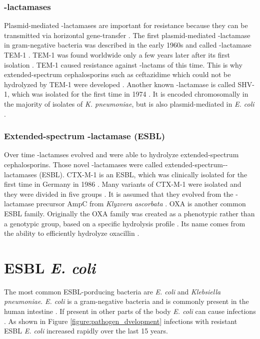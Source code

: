 \subsubsection{\textbeta-lactamases}
\label{section:resistance_mechanisms}
Plasmid-mediated \textbeta-lactamases are important for resistance because they can be transmitted via horizontal gene-transfer \cite{munita_mechanisms_2016}.  
The first plasmid-mediated \textbeta-lactamase in gram-negative bacteria was described in the early 1960s and called \textbeta-lactamase TEM-1  \cite{fernandes_-lactams:_2013}. TEM-1 was found worldwide only a few years later after its first isolation \cite{fernandes_-lactams:_2013}. TEM-1 caused resistance against \textbeta-lactams of this time.  This is why extended-spectrum cephalosporins such as ceftazidime which could not be hydrolyzed by TEM-1 were developed \cite{fernandes_-lactams:_2013}. Another known \textbeta-lactamase is called SHV-1, which was isolated for the first time in 1974 \cite{kuzin_structure_1999}. It is encoded chromosomally in the majority of isolates of \textit{K. pneumoniae}, but is also plasmid-mediated in \textit{E. coli} \cite{kuzin_structure_1999}. \\

\subsubsection{Extended-spectrum \textbeta-lactamase (ESBL)}
Over time \textbeta-lactamses evolved and were able to hydrolyze extended-spectrum cephalosporins. Those novel \textbeta-lactamases were called extended-spectrum-\textbeta-lactamases (ESBL).  
CTX-M-1 is an ESBL, which was clinically isolated for the first time in Germany in 1986 \cite{bradford_extended-spectrum_2001}. Many variants of CTX-M-1 were isolated and they were divided in five groups \cite{fernandes_-lactams:_2013}.
It is assumed that they evolved from the \textbeta-lactamase precursor AmpC from \textit{Klyzvera ascorbata}  \cite{bradford_extended-spectrum_2001}. 
OXA is another common ESBL family. Originally the OXA family was created as a phenotypic rather than a genotypic group, based on a specific hydrolysis profile \cite{bradford_extended-spectrum_2001}. Its name comes from the ability to efficiently hydrolyze oxacillin \cite{bradford_extended-spectrum_2001}. \\

\section{ESBL \textit{E. coli}}
The most common ESBL-porducing bacteria are \textit{E. coli} and \textit{Klebsiella pneumoniae}. \textit{E. coli} is a gram-negative bacteria and is commonly present in the human intestine \cite{swiss_hospitals_pathogens}. If present in other parts of the body \textit{E. coli} can cause infections \cite{swiss_hospitals_pathogens}. As shown in  Figure \ref{figure:pathogen_dvelopment} infections with resistant ESBL \textit{E. coli} increased rapidly over the last 15 years. 

